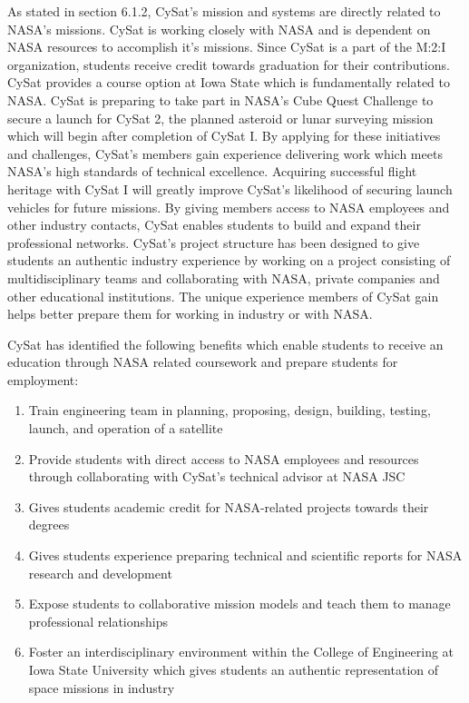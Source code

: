 \documentclass[nocover]            %
{CSLI}                       %
\begin{document}
As stated in section 6.1.2, CySat's mission and systems are directly related to NASA's missions. CySat is working closely with NASA and is dependent on NASA resources to accomplish it's missions. Since CySat is a part of the M:2:I organization, students receive credit towards graduation for their contributions.  CySat provides a course option at Iowa State which is fundamentally related to NASA. CySat is preparing to take part in NASA's Cube Quest Challenge to secure a launch for CySat 2, the planned asteroid or lunar surveying mission which will begin after completion of CySat I. By applying for these initiatives and challenges, CySat's members gain experience delivering work which meets NASA's high standards of technical excellence. Acquiring successful flight heritage with CySat I will greatly improve CySat's likelihood of securing launch vehicles for future missions. By giving members access to NASA employees and other industry contacts, CySat enables students to build and expand their professional networks. CySat's project structure has been designed to give students an authentic industry experience by working on a project consisting of multidisciplinary teams and collaborating with NASA, private companies and other educational institutions. The unique experience members of CySat gain helps better prepare them for working in industry or with NASA.

CySat has identified the following benefits which enable students to receive an education through NASA related coursework and prepare students for employment:
\begin{enumerate}
\item{Train engineering team in planning, proposing, design, building, testing, launch, and operation of a satellite}
\item{Provide students with direct access to NASA employees and resources through collaborating with CySat's technical advisor at NASA JSC}
\item{Gives students academic credit for NASA-related projects towards their degrees}
\item{Gives students experience preparing technical and scientific reports for NASA research and development}
\item{Expose students to collaborative mission models and teach them to manage professional relationships}
\item{Foster an interdisciplinary environment within the College of Engineering at Iowa State University which gives students an authentic representation of space missions in industry}
\end{enumerate} 
\end{document}
